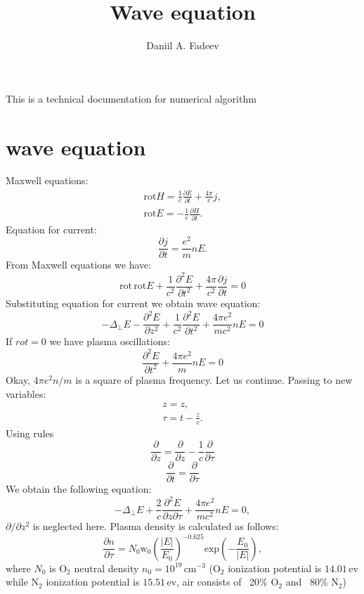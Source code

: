 \documentclass{article}
\title{Wave equation} %
\author{Daniil A. Fadeev}
\newcommand{\dd}{\partial}
\newcommand{\ff}{\frac}
\begin{document}
\maketitle
This is a technical documentation for numerical algorithm
\section{wave equation}
Maxwell equations:
\begin{eqnarray}
\mathrm{rot} H = \ff{1}{c}\ff{\dd E}{\dd t}+\ff{4\pi}{c} j, \\
\mathrm{rot} E = - \ff{1}{c}\ff{\dd H}{\dd t}.
\end{eqnarray}
Equation for current:
\begin{equation}
\ff{\dd j}{\dd t}=\ff{e^2}{m} n E.
\end{equation}
From Maxwell equations we have:
\[ \mathrm{rot}\,\mathrm{rot} E + \ff{1}{c^2}\ff{\dd^2 E}{\dd t^2}+\ff{4\pi}{c^2}\ff{\dd j}{\dd t}=0 \]
Substituting equation for current we obtain wave equation:
\begin{equation}
- \Delta_\perp E -\ff{\dd^2 E}{\dd z^2} + \ff{1}{c^2}\ff{\dd^2 E}{\dd t^2}+\ff{4\pi e^2}{m c^2} n E = 0
\end{equation}
If $rot=0$ we have plasma oscillations:
\begin{equation}
\ff{\dd^2 E}{\dd t^2}+\ff{4\pi e^2}{m} n E = 0
\end{equation}
Okay, $4 \pi e^2 n / m$ is a square of plasma frequency. Let us continue.
Passing to new variables:
\begin{eqnarray}
z = z, \\
\tau=t-\frac{z}{c}.
\end{eqnarray}
Using rules
\[ \ff{\dd}{\dd z}=\ff{\dd}{\dd z} -\ff{1}{c}\ff{\dd}{\dd \tau} \]
\[ \ff{\dd}{\dd t}=\ff{\dd}{\dd \tau} \]
We obtain the following equation:
\begin{equation}
- \Delta_\perp E +\ff{2}{c}\ff{\dd^2 E}{\dd z \dd \tau} +\ff{4\pi e^2}{m c^2} n E = 0,
\end{equation}
$\dd/\dd z^2$ is neglected here. Plasma density is calculated as follows:
\begin{equation}
\ff{\dd n}{\dd \tau}=N_0 \mathrm{w_0}\left(\ff{\left|E\right|}{E_0}\right)^{-0.625} \mathrm{exp}\left(-\ff{E_0}{\left|E\right|}\right),
\end{equation}
where $N_0$ is $\mathrm{O_2}$ neutral density $n_0=10^{19}\,\mathrm{cm}^{-3}$ ($\mathrm{O_2}$ ionization potential is $14.01\,\mathrm{ev}$ while $\mathrm{N_2}$ ionization potential is $15.51\,\mathrm{ev}$, air consists of ~20\% $\mathrm{O_2}$ and ~80\% $\mathrm{N_2}$)
\end{document}
